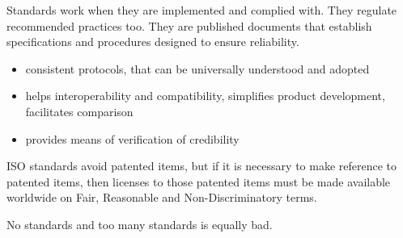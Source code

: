 \documentclass[10pt,a4paper,twocolumn]{article}
\begin{document}
Standards work when they are implemented and complied with. They regulate recommended
practices too. They are published documents that establish specifications and procedures
designed to ensure reliability.
\begin{itemize}
  \item consistent protocols, that can be universally understood and adopted
  \item helps interoperability and compatibility, simplifies product development,
  facilitates comparison
  \item provides means of verification of credibility
\end{itemize}
ISO standards avoid patented items, but if it is necessary to make reference to patented
items, then licenses to those patented items must be made available worldwide on Fair,
Reasonable and Non-Discriminatory terms.

No standards and too many standards is equally bad.


% 

% 
\end{document}

